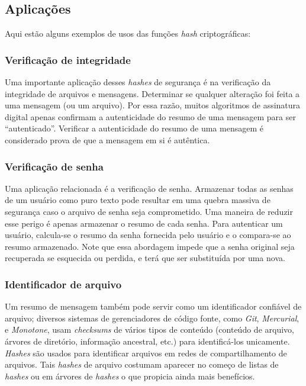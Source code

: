 \subsection{Aplicações}

Aqui estão alguns exemplos de usos das funções \textit{hash} criptográficas:

\subsubsection{Verificação de integridade}

Uma importante aplicação desses \textit{hashes} de segurança é na verificação da integridade de arquivos e mensagens.
Determinar se qualquer alteração foi feita a uma mensagem (ou um arquivo).
Por essa razão, muitos algoritmos de assinatura digital apenas confirmam a autenticidade do resumo de uma mensagem para ser ``autenticado''.
Verificar a autenticidade do resumo de uma mensagem é considerado prova de que a mensagem em si é autêntica.

\subsubsection{Verificação de senha}

Uma aplicação relacionada é a verificação de senha. 
Armazenar todas as senhas de um usuário como puro texto pode resultar em uma quebra massiva de segurança caso o arquivo de senha seja comprometido.
Uma maneira de reduzir esse perigo é apenas armazenar o resumo de cada senha.
Para autenticar um usuário, calcula-se o resumo da senha fornecida pelo usuário e o compara-se ao resumo armazenado.
Note que essa abordagem impede que a senha original seja recuperada se esquecida ou perdida, e terá que ser substituída por uma nova. 

\subsubsection{Identificador de arquivo}

Um resumo de mensagem também pode servir como um identificador confiável de arquivo; diversos sistemas de gerenciadores de código fonte, como \textit{Git}, \textit{Mercurial}, e \textit{Monotone}, usam \textit{checksums} de vários tipos de conteúdo (conteúdo de arquivo, árvores de diretório, informação ancestral, etc.) para identificá-los unicamente.
\textit{Hashes} são usados para identificar arquivos em redes de compartilhamento de arquivos.
Tais \textit{hashes} de arquivo costumam aparecer no começo de listas de \textit{hashes} ou em árvores de \textit{hashes} o que propicia ainda mais benefícios.

